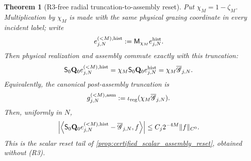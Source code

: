 \documentclass[11pt]{amsart}
\theoremstyle{compactplain}
\newtheorem{theorem}{Theorem}[section]
\theoremstyle{compactdefinition}
\theoremstyle{compactremark}
\begin{document}
\begin{theorem}[R3-free radial truncation-to-assembly reset]
Put \(\chi_M=1-\zeta_M\).  Multiplication by \(\chi_M\) is made with the
same physical grazing coordinate in every incident label; write
\begin{equation}
\label{eq:radial_historical_physical_truncation}
 e_{j,N}^{(<M),\rm hist}:=\mathsf M_{\chi_M}e_{j,N}^{\rm hist}.
\end{equation}
Then physical realization and assembly commute exactly with this truncation:
\begin{equation}
\label{eq:radial_truncation_assembly_commutation}
 \mathsf S_0\mathbf Q_0e_{j,N}^{(<M),\rm hist}
 =\chi_M\mathsf S_0\mathbf Q_0e_{j,N}^{\rm hist}
 =\chi_M\overline{\mathscr G}_{j,N}.
\end{equation}
Equivalently, the canonical post-assembly truncation is
\begin{equation}
\label{eq:radial_canonical_postassembly_truncation}
 g_{j,N}^{(<M),\rm asm}
 :=\iota_{\rm reg}(\chi_M\overline{\mathscr G}_{j,N}).
\end{equation}
Then, uniformly in \(N\),
\begin{equation}
\label{eq:radial_direct_scalar_reset_tail}
 \left|\left\langle
 \mathsf S_0\mathbf Q_0e_{j,N}^{(<M),\rm hist}
 -\overline{\mathscr G}_{j,N},f\right\rangle\right|
 \le C_j2^{-4M}\|f\|_{C^0}.
\end{equation}
This is the scalar reset tail of
\cref{prop:certified_scalar_assembly_reset}, obtained without (R3).
\end{theorem}
\end{document}
